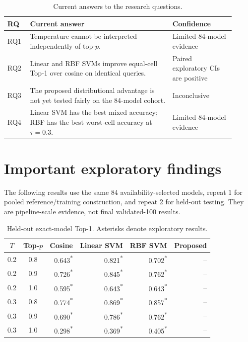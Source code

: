 \documentclass[10pt,a4paper]{article}
\newcommand{\demo}[1]{\textcolor{blue!65!black}{#1\textsuperscript{*}}}
\newcommand{\pending}{\textcolor{gray}{--}}
\begin{document}
\begin{table}[h]
\centering
\small
\caption{Current answers to the research questions.}
\begin{tabular}{p{0.08\linewidth}p{0.58\linewidth}p{0.25\linewidth}}
\toprule
RQ & Current answer & Confidence \\
\midrule
RQ1 & Temperature cannot be interpreted independently of top-$p$. &
Limited 84-model evidence \\
RQ2 & Linear and RBF SVMs improve equal-cell Top-1 over cosine on identical
queries. & Paired exploratory CIs are positive \\
RQ3 & The proposed distributional advantage is not yet tested fairly on the
84-model cohort. & Inconclusive \\
RQ4 & Linear SVM has the best mixed accuracy; RBF has the best worst-cell
accuracy at $\tau=0.3$. & Limited 84-model evidence \\
\bottomrule
\end{tabular}
\end{table}

\clearpage
\section{Important exploratory findings}

The following results use the same 84 availability-selected models, repeat 1
for pooled reference/training construction, and repeat 2 for held-out testing.
They are pipeline-scale evidence, not final validated-100 results.

\begin{table}[h]
\centering
\small
\caption{Held-out exact-model Top-1. Asterisks denote exploratory results.}
\begin{tabular}{ccrrrr}
\toprule
$T$ & Top-$p$ & Cosine & Linear SVM & RBF SVM & Proposed \\
\midrule
0.2 & 0.8 & \demo{0.643} & \demo{0.821} & \demo{0.702} & \pending \\
0.2 & 0.9 & \demo{0.726} & \demo{0.845} & \demo{0.762} & \pending \\
0.2 & 1.0 & \demo{0.595} & \demo{0.643} & \demo{0.643} & \pending \\
0.3 & 0.8 & \demo{0.774} & \demo{0.869} & \demo{0.857} & \pending \\
0.3 & 0.9 & \demo{0.690} & \demo{0.786} & \demo{0.762} & \pending \\
0.3 & 1.0 & \demo{0.298} & \demo{0.369} & \demo{0.405} & \pending \\
\bottomrule
\end{tabular}
\end{table}
\end{document}
